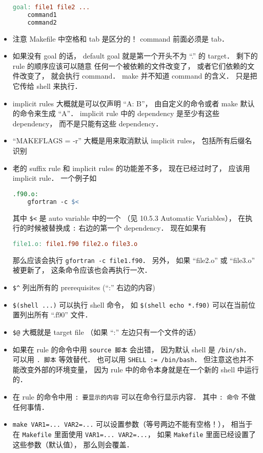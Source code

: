 \begin{itemize}
\begin{lstlisting}[language=makefile]
goal: file1 file2 ...
	command1
	command2
\end{lstlisting}
\item 注意 Makefile 中空格和 tab 是区分的！ command 前面必须是 tab．
\item 如果没有 goal 的话， default goal 就是第一个开头不为 “.” 的 target． 剩下的 rule 的顺序应该可以随意
任何一个被依赖的文件改变了， 或者它们依赖的文件改变了， 就会执行 command． make 并不知道 command 的含义． 只是把它传给 shell 来执行．
\item implicit rules 大概就是可以仅声明 “A: B”， 由自定义的命令或者 make 默认的命令来生成 “A”． implicit rule 中的 dependency 是至少有这些 dependency， 而不是只能有这些 dependency．
\item “MAKEFLAGS = -r” 大概是用来取消默认 implicit rules， 包括所有后缀名识别
\item 老的 suffix rule 和 implicit rules 的功能差不多， 现在已经过时了， 应该用 implicit rule． 一个例子如
\begin{lstlisting}[language=makefile]
.f90.o:
	gfortran -c $<
\end{lstlisting}
其中 \verb|$<| 是 auto variable 中的一个 （见 10.5.3 Automatic Variables）， 在执行的时候被替换成 \verb|:| 右边的第一个 dependency． 现在如果有
\begin{lstlisting}[language=makefile]
file1.o: file1.f90 file2.o file3.o
\end{lstlisting}
那么应该会执行 \verb|gfortran -c file1.f90|． 另外， 如果 “file2.o” 或 “file3.o” 被更新了， 这条命令应该也会再执行一次．
\item \verb|$^| 列出所有的 prerequisites (“:” 右边的内容)
\item \verb|$(shell ...)| 可以执行 shell 命令， 如 \verb|$(shell echo *.f90)| 可以在当前位置列出所有 “.f90” 文件．
\item \verb|$@| 大概就是 target file （如果 “:” 左边只有一个文件的话）
\item 如果在 rule 的命令中用 \verb|source 脚本| 会出错， 因为默认 shell 是 \verb|/bin/sh|． 可以用 \verb|. 脚本| 等效替代． 也可以用 \verb|SHELL := /bin/bash|． 但注意这也并不能改变外部的环境变量， 因为 rule 中的命令本身就是在一个新的 shell 中运行的．
\item 在 rule 的命令中用 \verb|: 要显示的内容| 可以在命令行显示内容． 其中 \verb|: 命令| 不做任何事情．
\item \verb|make VAR1=... VAR2=...| 可以设置参数（等号两边不能有空格！）， 相当于在 \verb|Makefile| 里面使用 \verb|VAR1=... VAR2=...|， 如果 \verb|Makefile| 里面已经设置了这些参数（默认值）， 那么则会覆盖． 
\end{itemize}
